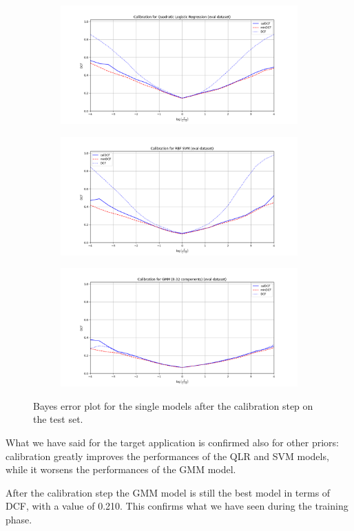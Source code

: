 \documentclass[12pt]{report}
\newcommand{\nnl}{%
    \newline
    \newline
}
\begin{document}
\begin{figure}[H]
    \centering
    \begin{subfigure}[t]{0.32\textwidth}
        \includegraphics[width=\textwidth]{./plot/eval/eval_calib_QLR.png}
    \end{subfigure}
    \hfill
    \begin{subfigure}[t]{0.32\textwidth}
        \includegraphics[width=\textwidth]{./plot/eval/eval_calib_RBF_SVM.png}
    \end{subfigure}
    \hfill
    \begin{subfigure}[t]{0.32\textwidth}
        \includegraphics[width=\textwidth]{./plot/eval/eval_calib_GMM.png}
    \end{subfigure}

    \caption{Bayes error plot for the single models after the calibration step on the test set.}
    \label{fig:calibration_single_models}
\end{figure}
\noindent
What we have said for the target application is confirmed also for other priors: calibration greatly improves the performances of the QLR and SVM models, while it worsens the performances of the GMM model.
\nnl
After the calibration step the GMM model is still the best model in terms of DCF, with a value of 0.210. This confirms what we have seen during the training phase.
\end{document}
